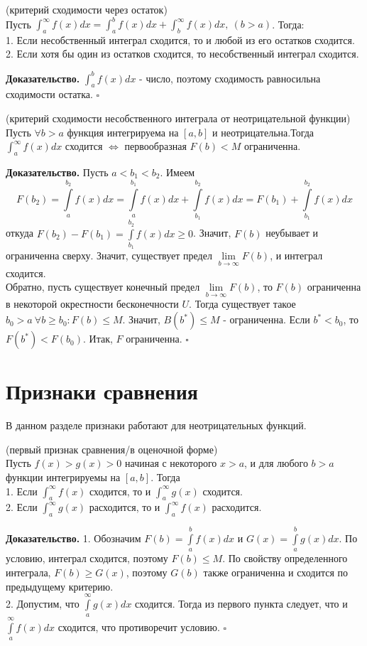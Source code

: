\begin{theor} (критерий сходимости через остаток)\\ \label{skhod_ost}
Пусть $\int^\infty_af(x)dx=\int^b_af(x)dx+\int^\infty_bf(x)dx,~(b>a)$. 
Тогда:\\
1. Если несобственный интеграл сходится, то и любой из его остатков сходится.\\
2. Если хотя бы один из остатков сходится, то несобственный интеграл сходится.
\end{theor}
\textbf{Доказательство.} $\int^b_af(x)dx$ - число, поэтому сходимость 
равносильна сходимости остатка. $\square$ 

\begin{theor} (критерий сходимости несобственного интеграла от неотрицательной
функции)\\
Пусть $\forall b>a$ функция интегрируема на $[a,b]$ и неотрицательна.Тогда
$\int^\infty_af(x)dx$ сходится $\Leftrightarrow$ первообразная $F(b)<M$ 
ограниченна.
\end{theor}
\textbf{Доказательство.} Пусть $a<b_1<b_2$. Имеем
$$F(b_2)=\int\limits_{a}^{b_2}f(x)dx=\int\limits_{a}^{b_1}f(x)dx+
\int\limits_{b_1}^{b_2}f(x)dx=F(b_1)+\int\limits_{b_1}^{b_2}f(x)dx$$
откуда $F(b_2)-F(b_1)=\int\limits_{b_1}^{b_2}f(x)dx\geqslant 0$. Значит,
$F(b)$ неубывает и ограниченна сверху. Значит, существует предел
$\lim\limits_{b \to \infty}F(b)$, и интеграл сходится.\\
Обратно, пусть существует конечный предел $\lim\limits_{b \to \infty} F(b)$,
то $F(b)$ ограниченна в некоторой окрестности бесконечности $U$.
Тогда существует такое $b_0>a~\forall b\geqslant b_0:F(b)\leqslant M$.
Значит, $B(b^*)\leqslant M$ - ограниченна. Если $b^*<b_0$, то
$F(b^*)<F(b_0)$. Итак, $F$ ограниченна. $\square$

\section{Признаки сравнения}
В данном разделе признаки работают для неотрицательных функций.
\begin{theor} (первый признак сравнения/в оценочной форме)\\
Пусть $f(x)>g(x)>0$ начиная с некоторого $x>a$, и для любого  $b>a$
функции интегрируемы на $[a,b]$. Тогда\\
1. Если  $\int^\infty_a f(x)$ сходится, то и  $\int^\infty_a g(x)$ сходится.\\
2. Если  $\int^\infty_a g(x)$ расходится, то и $\int^\infty_a f(x)$ расходится.
\end{theor}
\textbf{Доказательство.} 1. Обозначим $F(b)=\int\limits_{a}^{b}f(x)dx$ и
$G(x)=\int\limits_{a}^{b}g(x)dx$. По условию, интеграл сходится, поэтому
$F(b)\leqslant M$. По свойству определенного интеграла, $F(b)\geqslant G(x)$,
поэтому $G(b)$ также ограниченна и сходится по предыдущему критерию.\\
2. Допустим, что $\int\limits_{a}^{\infty}g(x)dx$ сходится. Тогда из 
первого пункта следует, что и $\int\limits_{a}^{\infty}f(x)dx$ сходится, 
что противоречит условию. $\square$ 

